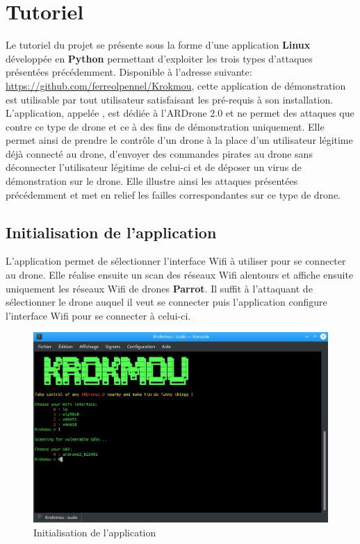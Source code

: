 \section{Tutoriel}
Le tutoriel du projet se présente sous la forme d'une application \textbf{Linux} développée en \textbf{Python} permettant d'exploiter les trois types d'attaques présentées précédemment. Disponible à l'adresse suivante: \url{https://github.com/ferreolpennel/Krokmou}, cette application de démonstration est utilisable par tout utilisateur satisfaisant les pré-requis à son installation. L'application, appelée , est dédiée à l'ARDrone 2.0 et ne permet des attaques que contre ce type de drone et ce à des fins de démonstration uniquement. Elle permet ainsi de prendre le contrôle d'un drone à la place d'un utilisateur légitime déjà connecté au drone, d'envoyer des commandes pirates au drone sans déconnecter l'utilisateur légitime de celui-ci et de déposer un virus de démonstration sur le drone. Elle illustre ainsi les attaques présentées précédemment et met en relief les failles correspondantes sur ce type de drone.

\subsection{Initialisation de l'application}
L'application permet de sélectionner l'interface Wifi à utiliser pour se connecter au drone. Elle réalise ensuite un scan des réseaux Wifi alentours et affiche ensuite uniquement les réseaux Wifi de drones \textbf{Parrot}. Il suffit à l'attaquant de sélectionner le drone auquel il veut se connecter puis l'application configure l'interface Wifi pour se connecter à celui-ci.

\begin{figure}[H]
  \centering
  \includegraphics[scale=0.3]{images/opening.png}
  \caption{Initialisation de l'application}
\end{figure}

